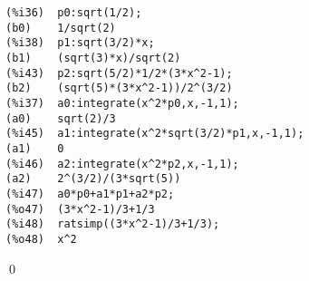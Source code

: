 \begin{verbatim}
(%i36)	p0:sqrt(1/2);
(b0)	1/sqrt(2)
(%i38)	p1:sqrt(3/2)*x;
(b1)	(sqrt(3)*x)/sqrt(2)
(%i43)	p2:sqrt(5/2)*1/2*(3*x^2-1);
(b2)	(sqrt(5)*(3*x^2-1))/2^(3/2)
(%i37)	a0:integrate(x^2*p0,x,-1,1);
(a0)	sqrt(2)/3
(%i45)	a1:integrate(x^2*sqrt(3/2)*p1,x,-1,1);
(a1)	0
(%i46)	a2:integrate(x^2*p2,x,-1,1);
(a2)	2^(3/2)/(3*sqrt(5))
(%i47)	a0*p0+a1*p1+a2*p2;
(%o47)	(3*x^2-1)/3+1/3
(%i48)	ratsimp((3*x^2-1)/3+1/3);
(%o48)	x^2
\end{verbatim}

\qed

